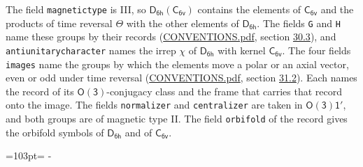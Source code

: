 \documentclass[10pt,a4paper]{article}
\newcommand{\needspace}[1]{\par\penalty-100\begingroup\dimen0=#1\relax\dimen2=\pagegoal
  \advance\dimen2-\pagetotal\ifdim\dimen0>\dimen2\relax\ifdim\dimen2>0pt\vfil\break\fi\fi
  \endgroup}
\numberwithin{equation}{section}
\newcommand{\grp}[1]{\mathsf{#1}}
\begin{document}
The field \texttt{magnetictype} is III, so $\grp{D_{6h}}(\grp{C_{6v}})$ contains the elements of $\grp{C_{6v}}$ and the products of time reversal $\varTheta$ with the other elements of $\grp{D_{6h}}$. The fields \texttt{G} and \texttt{H} name these groups by their records (\href{../../CONVENTIONS.pdf}{CONVENTIONS.pdf}, section \href{../../CONVENTIONS.pdf\#conv.30.3}{30.3}), and \texttt{antiunitarycharacter} names the irrep $\chi$ of $\grp{D_{6h}}$ with kernel $\grp{C_{6v}}$. The four fields \texttt{images} name the groups by which the elements move a polar or an axial vector, even or odd under time reversal (\href{../../CONVENTIONS.pdf}{CONVENTIONS.pdf}, section \href{../../CONVENTIONS.pdf\#conv.31.2}{31.2}). Each names the record of its $\grp{O(3)}$-conjugacy class and the frame that carries that record onto the image. The fields \texttt{normalizer} and \texttt{centralizer} are taken in $\grp{O(3)1'}$, and both groups are of magnetic type II. The field \texttt{orbifold} of the record gives the orbifold symbols of $\grp{D_{6h}}$ and of $\grp{C_{6v}}$.
\needspace{103pt}
\end{document}
